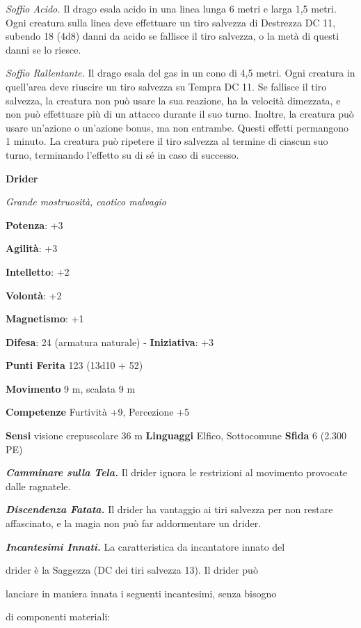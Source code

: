 \begin{multicols}{2}
\emph{Soffio Acido.} Il drago esala acido in una linea lunga 6 metri e
larga 1,5 metri. Ogni creatura sulla linea deve effettuare un tiro
salvezza di Destrezza DC 11, subendo 18 (4d8) danni da acido se fallisce
il tiro salvezza, o la metà di questi danni se lo riesce.

\emph{Soffio Rallentante.} Il drago esala del gas in un cono di 4,5
metri. Ogni creatura in quell'area deve riuscire un tiro salvezza su Tempra DC 11. Se fallisce il tiro salvezza, la creatura non può
usare la sua reazione, ha la velocità dimezzata, e non può effettuare
più di un attacco durante il suo turno. Inoltre, la creatura può usare
un'azione o un'azione bonus, ma non entrambe. Questi effetti permangono
1 minuto. La creatura può ripetere il tiro salvezza al termine di
ciascun suo turno, terminando l'effetto su di sé in caso di successo.



\textbf{Drider}

\emph{Grande mostruosità, caotico malvagio}

\textbf{Potenza}: +3

\textbf{Agilità}: +3

\textbf{Intelletto}: +2

\textbf{Volontà}: +2

\textbf{Magnetismo}: +1

\textbf{Difesa}: 24 (armatura naturale) - \textbf{Iniziativa}: +3

\textbf{Punti Ferita} 123 (13d10 + 52)

\textbf{Movimento} 9 m, scalata 9 m

\textbf{Competenze} Furtività +9, Percezione +5

\textbf{Sensi} visione crepuscolare 36 m
\textbf{Linguaggi} Elfico, Sottocomune \textbf{Sfida} 6 (2.300 PE)

\emph{\textbf{Camminare sulla Tela.}} Il drider ignora le restrizioni al
movimento provocate dalle ragnatele.

\emph{\textbf{Discendenza Fatata.}} Il drider ha vantaggio ai tiri
salvezza per non restare affascinato, e la magia non può far
addormentare un drider.

\emph{\textbf{Incantesimi Innati.}} La caratteristica da incantatore
innato del

drider è la Saggezza (DC dei tiri salvezza 13). Il drider può

lanciare in maniera innata i seguenti incantesimi, senza bisogno

di componenti materiali:


\end{multicols}
